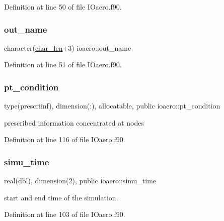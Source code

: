 Definition at line 50 of file I\+Oaero.\+f90.

\mbox{\label{namespaceioaero_a6693b9440660a84d2d2fc41ac183bb0f}} 
\subsubsection{\texorpdfstring{out\+\_\+name}{out\_name}}
{\footnotesize\ttfamily character(\hyperlink{namespaceioaero_acd6bdfdcfd986fd1c26261e5996e3b03}{char\+\_\+len}+3) ioaero\+::out\+\_\+name\hspace{0.3cm}{\ttfamily [private]}}



Definition at line 51 of file I\+Oaero.\+f90.

\mbox{\label{namespaceioaero_a4344b2018135ae7fe0a09f4265fd2c29}} 
\subsubsection{\texorpdfstring{pt\+\_\+condition}{pt\_condition}}
{\footnotesize\ttfamily type(prescriinf), dimension(\+:), allocatable, public ioaero\+::pt\+\_\+condition}



prescribed information concentrated at nodes 



Definition at line 116 of file I\+Oaero.\+f90.

\mbox{\label{namespaceioaero_ab6c271c9ebbeb9a315ec53d38facb60b}} 
\subsubsection{\texorpdfstring{simu\+\_\+time}{simu\_time}}
{\footnotesize\ttfamily real(dbl), dimension(2), public ioaero\+::simu\+\_\+time}



start and end time of the simulation. 



Definition at line 103 of file I\+Oaero.\+f90.

